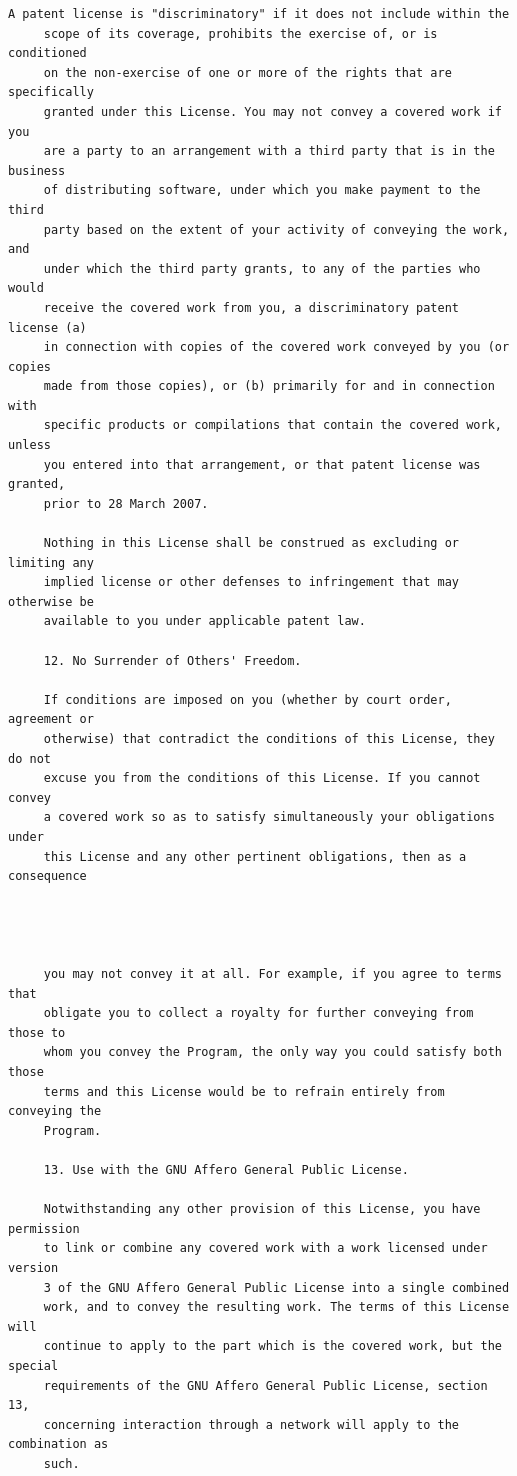 \begin{lstlisting}[basicstyle=\ttfamily\footnotesize,breaklines=true]
     A patent license is "discriminatory" if it does not include within the
     scope of its coverage, prohibits the exercise of, or is conditioned
     on the non-exercise of one or more of the rights that are specifically
     granted under this License. You may not convey a covered work if you
     are a party to an arrangement with a third party that is in the business
     of distributing software, under which you make payment to the third
     party based on the extent of your activity of conveying the work, and
     under which the third party grants, to any of the parties who would
     receive the covered work from you, a discriminatory patent license (a)
     in connection with copies of the covered work conveyed by you (or copies
     made from those copies), or (b) primarily for and in connection with
     specific products or compilations that contain the covered work, unless
     you entered into that arrangement, or that patent license was granted,
     prior to 28 March 2007.

     Nothing in this License shall be construed as excluding or limiting any
     implied license or other defenses to infringement that may otherwise be
     available to you under applicable patent law.

     12. No Surrender of Others' Freedom.

     If conditions are imposed on you (whether by court order, agreement or
     otherwise) that contradict the conditions of this License, they do not
     excuse you from the conditions of this License. If you cannot convey
     a covered work so as to satisfy simultaneously your obligations under
     this License and any other pertinent obligations, then as a consequence




     you may not convey it at all. For example, if you agree to terms that
     obligate you to collect a royalty for further conveying from those to
     whom you convey the Program, the only way you could satisfy both those
     terms and this License would be to refrain entirely from conveying the
     Program.

     13. Use with the GNU Affero General Public License.

     Notwithstanding any other provision of this License, you have permission
     to link or combine any covered work with a work licensed under version
     3 of the GNU Affero General Public License into a single combined
     work, and to convey the resulting work. The terms of this License will
     continue to apply to the part which is the covered work, but the special
     requirements of the GNU Affero General Public License, section 13,
     concerning interaction through a network will apply to the combination as
     such.


\end{lstlisting}
